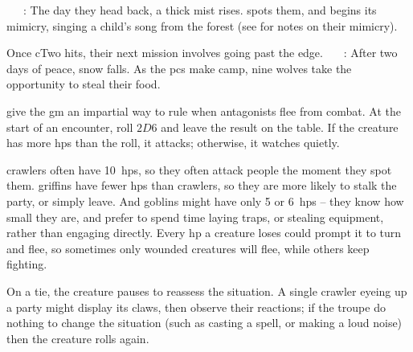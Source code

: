 \begin{multicols}{2}
{\begin{exampletext}
    ~~~: The day they head back, a thick mist rises.
     spots them, and begins its mimicry, singing a child's song from the forest (see  for notes on their mimicry).

    Once \gls{cTwo} hits, their next mission involves going past the \gls{edge}.
    ~~~: After two days of peace, snow falls.
    As the \glspl{pc} make camp, nine wolves take the opportunity to steal their food.

  \end{exampletext}
}{
  \toggletrue{genExamples}
  \allEncounterTables
}

give the \gls{gm} an impartial way to rule when antagonists flee from combat.
At the start of an encounter, roll $2D6$ and leave the result on the table.
If the creature has more \glspl{hp} than the roll, it attacks; otherwise, it watches quietly.


\Glspl{crawler} often have 10~\glspl{hp}, so they often attack people the moment they spot them.
\Glspl{griffin} have fewer \glspl{hp} than \glspl{crawler}, so they are more likely to stalk the party, or simply leave.
And goblins might have only 5 or 6~\glspl{hp} -- they know how small they are, and prefer to spend time laying traps, or stealing equipment, rather than engaging directly.
Every \gls{hp} a creature loses could prompt it to turn and flee, so sometimes only wounded creatures will flee, while others keep fighting.

On a tie, the creature pauses to reassess the situation.
A single \gls{crawler} eyeing up a party might display its claws, then observe their reactions; if the troupe do nothing to change the situation (such as casting a spell, or making a loud noise) then the creature rolls again.


\end{multicols}
